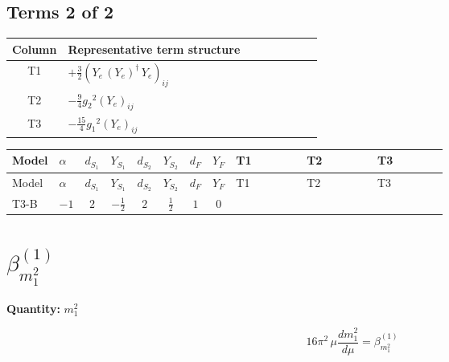 \documentclass[8pt]{article}
\begin{document}
\begin{landscape}
\subsection*{Terms 2 of 2}
\begin{center}
\begin{tabular}{@{}c >{\raggedright\arraybackslash}p{0.82\linewidth}@{}}
\toprule
Column & Representative term structure \\
\midrule
T1 & \(\displaystyle +\frac{3}{2} \left({Y_e}\,\left({Y_e}\right)^{\dagger}\,{Y_e}\right)_{ij}\) \\
\midrule
T2 & \(\displaystyle -\frac{9}{4} {g_2}^2 \left({Y_e}\right)_{ij}\) \\
\midrule
T3 & \(\displaystyle -\frac{15}{4} {g_1}^2 \left({Y_e}\right)_{ij}\) \\
\midrule
\bottomrule
\end{tabular}
\end{center}
\smallskip
\tiny
\begin{longtable}{@{}llcccccc >{\raggedright\arraybackslash}p{0.21\linewidth} >{\raggedright\arraybackslash}p{0.21\linewidth} >{\raggedright\arraybackslash}p{0.21\linewidth}@{}}
\toprule
Model & $\alpha$ & $d_{S_1}$ & $Y_{S_1}$ & $d_{S_2}$ & $Y_{S_2}$ & $d_F$ & $Y_F$ & T1 & T2 & T3 \\
\midrule
\endfirsthead
\toprule
Model & $\alpha$ & $d_{S_1}$ & $Y_{S_1}$ & $d_{S_2}$ & $Y_{S_2}$ & $d_F$ & $Y_F$ & T1 & T2 & T3 \\
\midrule
\endhead
T3-B & $-1$ & $2$ & $-\frac{1}{2}$ & $2$ & $\frac{1}{2}$ & $1$ & $0$ & \scriptsize\adjustbox{max width=\linewidth}{$\begin{gathered} +\frac{3}{2} \left({Y_e}\,\left({Y_e}\right)^{\dagger}\,{Y_e}\right)_{ij}\end{gathered}$} & \scriptsize\adjustbox{max width=\linewidth}{$\begin{gathered} -\frac{9}{4} {g_2}^2 \left({Y_e}\right)_{ij}\end{gathered}$} & \scriptsize\adjustbox{max width=\linewidth}{$\begin{gathered} -\frac{15}{4} {g_1}^2 \left({Y_e}\right)_{ij}\end{gathered}$} \\
\midrule
\bottomrule
\end{longtable}
\clearpage
\section*{$\beta_{m_1^2}^{(1)}$}
\noindent\textbf{Quantity: }$m_1^2$\par\smallskip
\[16\pi^2\,\mu\frac{d m_1^2}{d\mu}=\beta_{m_1^2}^{(1)}\]

\end{landscape}
\end{document}
